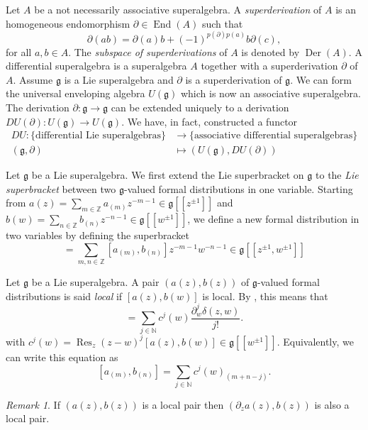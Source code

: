 \documentclass[a4paper, 12pt, reqno]{amsart}
\theoremstyle{remark}
\newtheorem{remark}[theorem]{Remark}
\numberwithin{equation}{subsection}
\DeclareMathOperator{\End}{End}
\DeclareMathOperator{\Res}{Res}
\DeclareMathOperator{\Der}{Der}
\begin{document}
Let $A$ be a not necessarily associative superalgebra.
A \emph{superderivation} of $A$ is an homogeneous endomorphism $\partial \in \End(A)$ such that
\begin{equation*}
  \partial(ab) = \partial(a)b + (-1)^{p(\partial)p(a)}b\partial(c),
\end{equation*}
for all $a, b \in A$.
The \emph{subspace of superderivations} of $A$ is denoted by $\Der(A)$.
A differential superalgebra is a superalgebra $A$ together with a superderivation $\partial$ of $A$.
Assume $\mathfrak{g}$ is a Lie superalgebra and $\partial$ is a superderivation of $\mathfrak{g}$.
We can form the universal enveloping algebra $U(\mathfrak{g})$ which is now an associative superalgebra.
The derivation $\partial: \mathfrak{g} \to \mathfrak{g}$ can be extended uniquely to a derivation $DU(\partial): U(\mathfrak{g}) \to U(\mathfrak{g})$.
We have, in fact, constructed a functor
\begin{align*}
  DU: \{\text{differential Lie superalgebras}\} &\to \{\text{associative differential superalgebras}\} \\
  (\mathfrak{g}, \partial) &\mapsto (U(\mathfrak{g}), DU(\partial))
\end{align*}

Let $\mathfrak{g}$ be a Lie superalgebra.
We first extend the Lie superbracket on $\mathfrak{g}$ to the \emph{Lie superbracket} between two $\mathfrak{g}$-valued formal distributions in one variable. Starting from $a(z) = \sum_{m \in \mathbb{Z}}a_{(m)}z^{-m - 1} \in \mathfrak{g}[[z^{\pm 1}]]$ and $b(w) = \sum_{n \in \mathbb{Z}}b_{(n)}z^{-n - 1} \in \mathfrak{g}[[w^{\pm 1}]]$, we define a new formal distribution in two variables by defining the superbracket
\begin{equation*}
  [a(z), b(w)] = \sum_{m, n \in \mathbb{Z}}[a_{(m)}, b_{(n)}]z^{-m - 1}w^{-n - 1} \in \mathfrak{g}[[z^{\pm 1}, w^{\pm 1}]]
\end{equation*}

Let $\mathfrak{g}$ be a Lie superalgebra.
A pair $(a(z), b(z))$ of $\mathfrak{g}$-valued formal distributions is said \emph{local} if $[a(z), b(w)]$ is local.
By , this means that
\begin{equation*}
  [a(z), b(w)] = \sum_{j \in \mathbb{N}}c^j(w)\frac{\partial^j_w\delta(z, w)}{j!}.
\end{equation*}
with $c^j(w) = \Res_z(z - w)^j[a(z), b(w)] \in \mathfrak{g}[[w^{\pm 1}]]$.
Equivalently, we can write this equation as
\begin{equation}
  \label{eq:3}
  [a_{(m)}, b_{(n)}] = \sum_{j \in \mathbb{N}}c^j(w)_{(m + n - j)}.
\end{equation}
\begin{remark}
  \label{rmk:2}
  If $(a(z), b(z))$ is a local pair then $(\partial_za(z), b(z))$ is also a local pair.
\end{remark}
\end{document}
